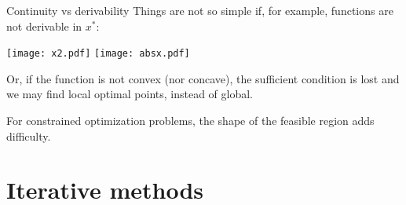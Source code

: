 \documentclass[c]{beamer}
\begin{document}
\begin{frame}[t]{Continuity vs derivability}
  Things are not so simple if, for example, functions are not derivable in $x^*$:
  \begin{center}
    \texttt{[image: x2.pdf]}
    \texttt{[image: absx.pdf]}
  \end{center}
  Or, if the function is not convex (nor concave), the sufficient condition is lost and we may find local optimal points, instead of global.

  For constrained optimization problems, the shape of the feasible region adds difficulty.
\end{frame}



\section{Iterative methods}
\end{document}
